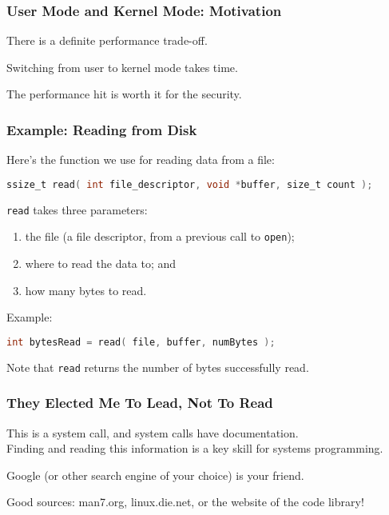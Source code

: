 \begin{frame}
	\frametitle{User Mode and Kernel Mode: Motivation}

	There is a definite performance trade-off.

	Switching from user to kernel mode takes time.

	The performance hit is worth it for the security.

\end{frame}

\begin{frame}[fragile]
	\frametitle{Example: Reading from Disk}
	
Here's the function we use for reading data from a file:
	
		\begin{lstlisting}[language=C]
ssize_t read( int file_descriptor, void *buffer, size_t count );
		\end{lstlisting}


	\texttt{read} takes three parameters:
	\begin{enumerate}
		\item the file (a file descriptor, from a previous call
		      to \texttt{open});
		\item where to read the data to; and
		\item how many bytes to read.
	\end{enumerate}
	
	Example:

		\begin{lstlisting}[language=C]
int bytesRead = read( file, buffer, numBytes );
		\end{lstlisting}


	Note that \texttt{read} returns the number of bytes successfully read.

\end{frame}


\begin{frame}
\frametitle{They Elected Me To Lead, Not To Read}

This is a system call, and system calls have documentation.\\
\quad Finding and reading this information is a key skill for systems programming.

Google (or other search engine of your choice) is your friend.

Good sources: man7.org, linux.die.net, or the website of the code library!

\end{frame}


